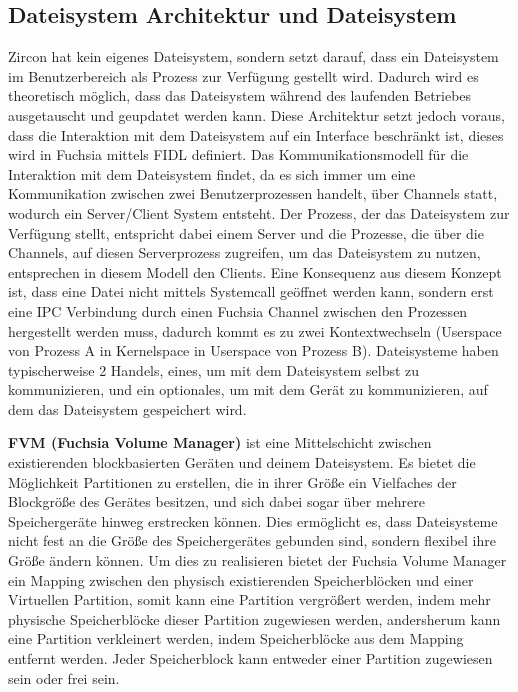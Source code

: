\documentclass[a4paper]{scrartcl}
\begin{document}
\subsection{Dateisystem Architektur und Dateisystem}
Zircon hat kein eigenes Dateisystem, sondern setzt darauf, dass ein Dateisystem im Benutzerbereich als Prozess zur Verfügung gestellt wird. Dadurch wird es theoretisch möglich, dass das Dateisystem während des laufenden Betriebes ausgetauscht und geupdatet werden kann. Diese Architektur setzt jedoch voraus, dass die Interaktion mit dem Dateisystem auf ein Interface beschränkt ist, dieses wird in Fuchsia mittels FIDL definiert.\cite{Fuchsia.FIDL.io}\cite{Fuchsia.FIDL.io2} Das Kommunikationsmodell für die Interaktion mit dem Dateisystem findet, da es sich immer um eine Kommunikation zwischen zwei Benutzerprozessen handelt, über Channels statt, wodurch ein Server/Client System entsteht. Der Prozess, der das Dateisystem zur Verfügung stellt, entspricht dabei einem Server und die Prozesse, die über die Channels, auf diesen Serverprozess zugreifen, um das Dateisystem zu nutzen, entsprechen in diesem Modell den Clients. Eine Konsequenz aus diesem Konzept ist, dass eine Datei nicht mittels Systemcall geöffnet werden kann, sondern erst eine IPC Verbindung durch einen Fuchsia Channel \cite{Fuchsia.Kernel.KernelObjects} zwischen den Prozessen hergestellt werden muss, dadurch kommt es zu zwei Kontextwechseln (Userspace von Prozess A in Kernelspace in Userspace von Prozess B). Dateisysteme haben typischerweise 2 Handels, eines, um mit dem Dateisystem selbst zu kommunizieren, und ein optionales, um mit dem Gerät zu kommunizieren, auf dem das Dateisystem gespeichert wird.

\textbf{FVM (Fuchsia Volume Manager)} ist eine Mittelschicht zwischen existierenden blockbasierten Geräten und deinem Dateisystem. Es bietet die Möglichkeit Partitionen zu erstellen, die in ihrer Größe ein Vielfaches der Blockgröße des Gerätes besitzen, und sich dabei sogar über mehrere Speichergeräte hinweg erstrecken können. Dies ermöglicht es, dass Dateisysteme nicht fest an die Größe des Speichergerätes gebunden sind, sondern flexibel ihre Größe ändern können. Um dies zu realisieren bietet der Fuchsia Volume Manager ein Mapping zwischen den physisch existierenden Speicherblöcken und einer Virtuellen Partition, somit kann eine Partition vergrößert werden, indem mehr physische Speicherblöcke dieser Partition zugewiesen werden, andersherum kann eine Partition verkleinert werden, indem Speicherblöcke aus dem Mapping entfernt werden. Jeder Speicherblock kann entweder einer Partition zugewiesen sein oder frei sein.
\end{document}
